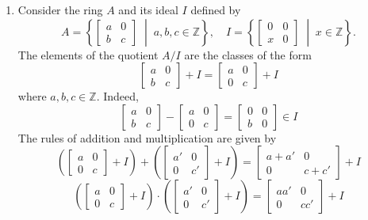 \documentclass[11pt,a4paper]{article}
\begin{document}
\begin{exa}
\begin{enumerate}[label=(\roman*)]
\item Consider the ring \( A \) and its ideal \( I \) defined by
\[
A =   \left\{ \begin{bmatrix} a & 0 \\ b & c \end{bmatrix} \;\middle|\; a, b, c \in \mathbb{Z} \right\},\quad I = \left\{ \begin{bmatrix} 0 & 0 \\ x & 0 \end{bmatrix} \;\middle|\; x \in \mathbb{Z} \right\}.
\]
The elements of the quotient \( A/I \) are the classes of the form
\[
\begin{bmatrix} a & 0 \\ b & c \end{bmatrix} + I = \begin{bmatrix} a & 0 \\ 0 & c \end{bmatrix} + I
\]
where \( a, b, c \in \mathbb{Z} \). Indeed,
\[
\begin{bmatrix} a & 0 \\ b & c \end{bmatrix} - \begin{bmatrix} a & 0 \\ 0 & c \end{bmatrix} = \begin{bmatrix} 0 & 0 \\ b & 0 \end{bmatrix} \in I
\]
The rules of addition and multiplication are given by
\[
\left( \begin{bmatrix} a & 0 \\ 0 & c \end{bmatrix} + I \right) + \left( \begin{bmatrix} a' & 0 \\ 0 & c' \end{bmatrix} + I \right) = \begin{bmatrix} a + a' & 0 \\ 0 & c + c' \end{bmatrix} + I
\]
\[
\left( \begin{bmatrix} a & 0 \\ 0 & c \end{bmatrix} + I \right) \cdot \left( \begin{bmatrix} a' & 0 \\ 0 & c' \end{bmatrix} + I \right) = \begin{bmatrix} aa' & 0 \\ 0 & cc' \end{bmatrix} + I
\]

\end{enumerate}
\end{exa}
\end{document}
